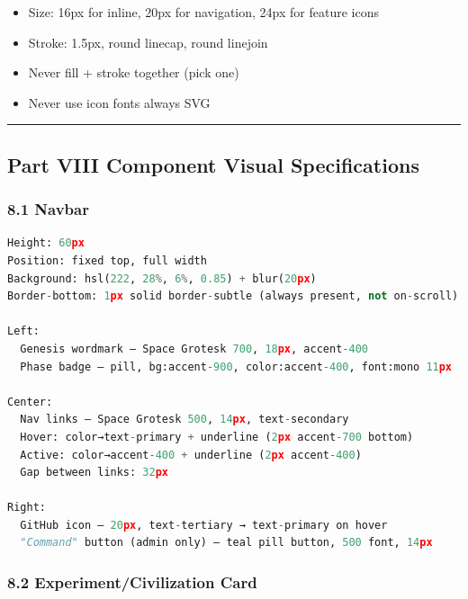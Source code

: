 \documentclass[11pt,a4paper]{article}
\begin{document}
\begin{itemize}
  \item Size: 16px for inline, 20px for navigation, 24px for feature icons
  \item Stroke: 1.5px, round linecap, round linejoin
  \item Never fill + stroke together (pick one)
  \item Never use icon fonts  always SVG
\end{itemize}

\noindent\rule{\textwidth}{0.4pt}

\subsection*{Part VIII  Component Visual Specifications}

\subsubsection*{8.1 Navbar}

\begin{lstlisting}[language=Python]
Height: 60px
Position: fixed top, full width
Background: hsl(222, 28%, 6%, 0.85) + blur(20px)
Border-bottom: 1px solid border-subtle (always present, not on-scroll)

Left:
  Genesis wordmark — Space Grotesk 700, 18px, accent-400
  Phase badge — pill, bg:accent-900, color:accent-400, font:mono 11px

Center:
  Nav links — Space Grotesk 500, 14px, text-secondary
  Hover: color→text-primary + underline (2px accent-700 bottom)
  Active: color→accent-400 + underline (2px accent-400)
  Gap between links: 32px

Right:
  GitHub icon — 20px, text-tertiary → text-primary on hover
  "Command" button (admin only) — teal pill button, 500 font, 14px
\end{lstlisting}

\subsubsection*{8.2 Experiment/Civilization Card}
\end{document}

